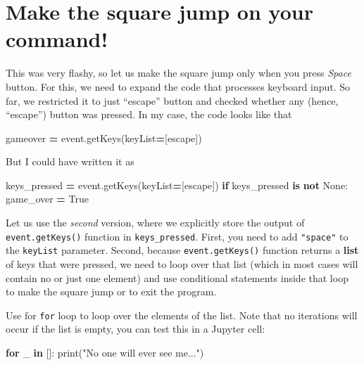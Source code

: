 \documentclass[
]{book}
\newenvironment{Shaded}{\begin{snugshade}}{\end{snugshade}}
\newcommand{\BuiltInTok}[1]{#1}
\newcommand{\ControlFlowTok}[1]{\textcolor[rgb]{0.13,0.29,0.53}{\textbf{#1}}}
\newcommand{\KeywordTok}[1]{\textcolor[rgb]{0.13,0.29,0.53}{\textbf{#1}}}
\newcommand{\NormalTok}[1]{#1}
\newcommand{\OperatorTok}[1]{\textcolor[rgb]{0.81,0.36,0.00}{\textbf{#1}}}
\newcommand{\StringTok}[1]{\textcolor[rgb]{0.31,0.60,0.02}{#1}}
\newcommand{\VariableTok}[1]{\textcolor[rgb]{0.00,0.00,0.00}{#1}}
\begin{document}
\hypertarget{make-the-square-jump-on-your-command}{%
\section{Make the square jump on your command!}\label{make-the-square-jump-on-your-command}}

This was very flashy, so let us make the square jump only when you press \emph{Space} button. For this, we need to expand the code that processes keyboard input. So far, we restricted it to just ``escape'' button and checked whether any (hence, ``escape'') button was pressed. In my case, the code looks like that

\begin{Shaded}
\begin{Highlighting}[]
\NormalTok{gameover }\OperatorTok{=}\NormalTok{ event.getKeys(keyList}\OperatorTok{=}\NormalTok{[}\StringTok{\textquotesingle{}escape\textquotesingle{}}\NormalTok{])}
\end{Highlighting}
\end{Shaded}

But I could have written it as

\begin{Shaded}
\begin{Highlighting}[]
\NormalTok{keys\_pressed }\OperatorTok{=}\NormalTok{ event.getKeys(keyList}\OperatorTok{=}\NormalTok{[}\StringTok{\textquotesingle{}escape\textquotesingle{}}\NormalTok{])}
\ControlFlowTok{if}\NormalTok{ keys\_pressed }\KeywordTok{is} \KeywordTok{not} \VariableTok{None}\NormalTok{:}
\NormalTok{    game\_over }\OperatorTok{=} \VariableTok{True}
\end{Highlighting}
\end{Shaded}

Let us use the \emph{second} version, where we explicitly store the output of \texttt{event.getKeys()} function in \texttt{keys\_pressed}. First, you need to add \texttt{"space"} to the \texttt{keyList} parameter. Second, because \texttt{event.getKeys()} function returns a \textbf{list} of keys that were pressed, we need to loop over that list (which in most cases will contain no or just one element) and use conditional statements inside that loop to make the square jump or to exit the program.

Use for \texttt{for} loop to loop over the elements of the list. Note that no iterations will occur if the list is empty, you can test this in a Jupyter cell:

\begin{Shaded}
\begin{Highlighting}[]
\ControlFlowTok{for}\NormalTok{ \_ }\KeywordTok{in}\NormalTok{ []:}
    \BuiltInTok{print}\NormalTok{(}\StringTok{"No one will ever see me..."}\NormalTok{)}
\end{Highlighting}
\end{Shaded}
\end{document}
